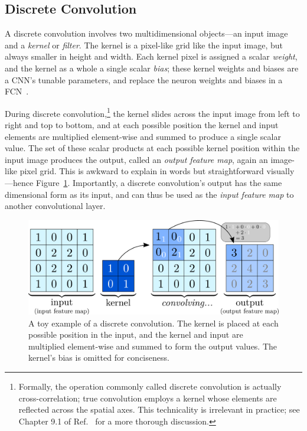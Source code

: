 \documentclass[11pt, a4paper]{article}
\begin{document}
\subsection{Discrete Convolution} \label{ss:discrete-conv}

A discrete convolution involves two multidimensional objects---an input image and a \textit{kernel} or \textit{filter}.
The kernel is a pixel-like grid like the input image, but always smaller in height and width.
Each kernel pixel is assigned a scalar \textit{weight}, and the kernel as a whole a single scalar \textit{bias}; these kernel weights and biases are a CNN's tunable parameters, and replace the neuron weights and biases in a FCN~\cite{homl, goodfellow}.

During discrete convolution,\footnote{Formally, the operation commonly called discrete convolution is actually cross-correlation; true convolution employs a kernel whose elements are reflected across the spatial axes.
This technicality is irrelevant in practice; see Chapter 9.1 of Ref.~\cite{goodfellow} for a more thorough discussion.} the kernel slides across the input image from left to right and top to bottom, and at each possible position the kernel and input elements are multiplied element-wise and summed to produce a single scalar value.
The set of these scalar products at each possible kernel position within the input image produces the output, called an \textit{output feature map}, again an image-like pixel grid.
This is awkward to explain in words but straightforward visually---hence Figure~\ref{fig:conv-single-channel}.
Importantly, a discrete convolution's output has the same dimensional form as its input, and can thus be used as the \textit{input feature map} to another convolutional layer.

\begin{figure}[htb!]
    \centering
    \includegraphics[width=0.8\linewidth]{vector/conv-single-channel.pdf}
    \vspace{-2mm}
    \caption{A toy example of a discrete convolution.
    The kernel is placed at each possible position in the input, and the kernel and input are multiplied element-wise and summed to form the output values.
    The kernel's bias is omitted for conciseness.}
    \label{fig:conv-single-channel}
\end{figure}
\end{document}
